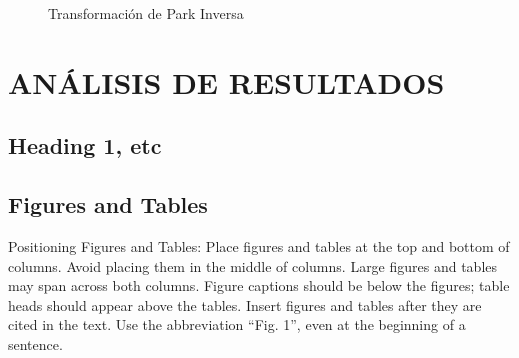 \documentclass[a4paper, 10pt, journal]{ieeeconf}
\begin{document}
\begin{figure}[thpb]
    \centering
    \begin{adjustbox}{max width=\columnwidth}
    \end{adjustbox}
    \caption{Transformación de Park Inversa}
    \label{transformación de park inversa}
\end{figure}




























\section{ANÁLISIS DE RESULTADOS}


\subsection{Heading 1, etc}


\subsection{Figures and Tables}

Positioning Figures and Tables: Place figures and tables at the top and bottom of columns. Avoid placing them in the middle of columns. Large figures and tables may span across both columns. Figure captions should be below the figures; table heads should appear above the tables. Insert figures and tables after they are cited in the text. Use the abbreviation ``Fig. 1'', even at the beginning of a sentence.
\end{document}
